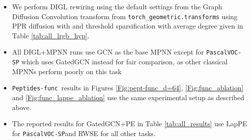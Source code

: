 \documentclass{article}
\newcommand{\code}[1]{\colorbox{light-gray}{\small{\texttt{#1}}}}
\newcommand{\func}{\texttt{Peptides-func}}
\theoremstyle{plain}
\theoremstyle{definition}
\theoremstyle{remark}
\begin{document}
\begin{itemize}
    \item We perform DIGL rewiring using the default settings from the Graph Diffusion Convolution transform from \code{torch\_geometric.transforms} using PPR diffusion with  and threshold sparsification with average degree  given in Table \ref{tab:all_lrgb_hyp}.
    \item All DIGL+MPNN runs use GCN as the base MPNN except for \texttt{PascalVOC-SP} which uses GatedGCN instead for fair comparison, as other classical MPNNs perform poorly on this task
    \item \func\ results in Figures \ref{Fig:pept-func_d=64}, \ref{Fig:func_ablation} and \ref{Fig:func_lappe_ablation} use the same experimental setup as described above.
    \item The reported results for GatedGCN+PE in Table \ref{tab:all_results} use LapPE for \texttt{PascalVOC-SP}and RWSE for all other tasks.

\end{itemize}
\end{document}
